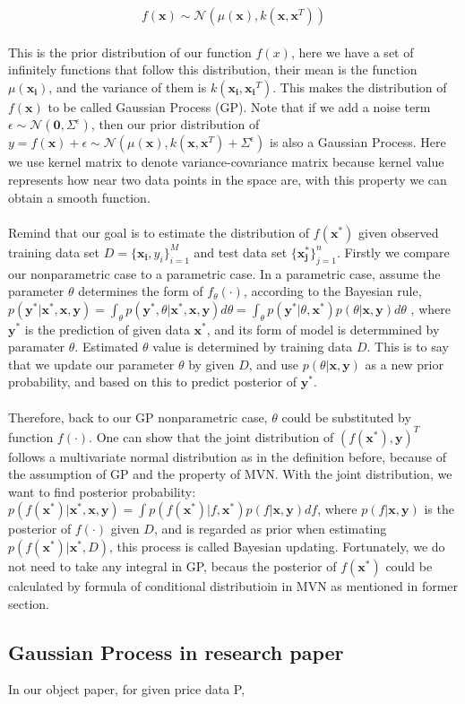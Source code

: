 \documentclass[UTF8]{article}
\begin{document}
\begin{equation}
f(\boldsymbol{x}) \sim \mathcal{N}(\mu(\boldsymbol{x}), k(\boldsymbol{x},\boldsymbol{x}^T)) 
\end{equation}
\\ 
This is the prior distribution of our function $f(x)$, here we have a set of infinitely functions that follow this distribution, their mean is the function $\mu(\boldsymbol{x_i})$, and the variance of them is $k(\boldsymbol{x_i},\boldsymbol{x_i}^T)$. This makes the distribution of $f(\boldsymbol{x})$ to be called Gaussian Process (GP). Note that if we add a noise term $\epsilon \sim \mathcal{N}(\boldsymbol{0},\varSigma^{\epsilon})$, then our prior distribution of $y = f(\boldsymbol{x}) + \epsilon \sim \mathcal{N}(\mu(\boldsymbol{x}), k(\boldsymbol{x},\boldsymbol{x}^T) + \varSigma^{\epsilon})$ is also a Gaussian Process. Here we use kernel matrix to denote variance-covariance matrix because kernel value represents how near two data points in the space are, with this property we can obtain a smooth function.  \\ \\
Remind that our goal is to estimate the distribution of $f(\boldsymbol{x^*})$ given observed training data set $D = \{\boldsymbol{x_i}, y_i\}_{i = 1}^M$ and test data set $\{\boldsymbol{x_j^*}\}_{j = 1}^n$. Firstly we compare our nonparametric case to a parametric case. In a parametric case, assume the parameter $\theta$ determines the form of $f_{\theta}(\cdot)$, according to the Bayesian rule, 
$
p(\boldsymbol{y^*} | \boldsymbol{x^*}, \boldsymbol{x}, \boldsymbol{y}) = \int_{\theta} p(\boldsymbol{y^*}, \theta |  \boldsymbol{x^*}, \boldsymbol{x}, \boldsymbol{y})d\theta = \int_{\theta} p(\boldsymbol{y^*} | \theta, \boldsymbol{x^*})p(\theta | \boldsymbol{x}, \boldsymbol{y})d\theta
$
, where $\boldsymbol{y^*}$ is the prediction of given data $\boldsymbol{x^*}$, and its form of model is determmined by paramater $\theta$. Estimated $\theta$ value is determined by training data $D$. This is to say that we update our parameter $\theta$ by given $D$, and use $p(\theta | \boldsymbol{x}, \boldsymbol{y})$ as a new prior probability, and based on this to predict posterior of $\boldsymbol{y^*}$.  \\ \\
Therefore, back to our GP nonparametric case, $\theta$ could be substituted by function $f(\cdot)$. One can show that the joint distribution of $(f(\boldsymbol{x^*}), \boldsymbol{y})^T$ follows a multivariate normal distribution as in the definition before, because of the assumption of GP and the property of MVN. With the joint distribution, we want to find posterior probability:  $p(f(\boldsymbol{x^*}) | \boldsymbol{x^*}, \boldsymbol{x}, \boldsymbol{y}) = \int p(f(\boldsymbol{x^*}) | f, \boldsymbol{x^*})p(f | \boldsymbol{x}, \boldsymbol{y})df$, where $p(f | \boldsymbol{x}, \boldsymbol{y})$ is the posterior of $f(\cdot)$ given $D$, and is regarded as prior when estimating $p(f(\boldsymbol{x^*}) | \boldsymbol{x^*}, D)$, this process is called Bayesian updating. Fortunately, we do not need to take any integral in GP, becaus the posterior of $f(\boldsymbol{x^*})$ could be calculated by formula of conditional distributioin in MVN as mentioned in former section. 

\subsection{Gaussian Process in research paper}
In our object paper, for given price data P, 
\end{document}
